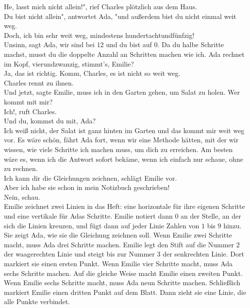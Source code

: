 \frqq{}He, lasst mich nicht allein!", rief Charles plötzlich aus dem Haus.\flqq{}\\
\frqq{}Du bist nicht allein", antwortet Ada, "und außerdem bist du nicht einmal weit weg.\flqq{}\\
\frqq{}Doch, ich bin sehr weit weg, mindestens hundertachtundfünfzig!\flqq{}\\
\frqq{}Unsinn\flqq{}, sagt Ada, \frqq{}wir sind bei $12$ und du bist auf $0$. Da du halbe Schritte machst, musst du die doppelte Anzahl an Schritten machen wie ich. Ada rechnet im Kopf, vierundzwanzig, stimmt's, Emilie?\flqq{}\\
\frqq{}Ja, das ist richtig. Komm, Charles, es ist nicht so weit weg.\flqq{}\\
Charles rennt zu ihnen.\\ 
\frqq{}Und jetzt\flqq{}, sagte Emilie, \frqq{}muss ich in den Garten gehen, um Salat zu holen. Wer kommt mit mir?\flqq{}\\
\frqq{}Ich!\flqq{}, ruft Charles.\\
\frqq{}Und du, kommst du mit, Ada?\flqq{}\\
\frqq{}Ich weiß nicht, der Salat ist ganz hinten im Garten und das kommt mir weit weg vor. Es wäre schön\flqq{}, fährt Ada fort, \frqq{}wenn wir eine Methode hätten, mit der wir wissen, wie viele Schritte ich machen muss, um dich zu erreichen. Am besten wäre es, wenn ich die Antwort sofort bekäme, wenn ich einfach nur schaue, ohne zu rechnen.\flqq{}\\
\frqq{}Ich kann dir die Gleichungen zeichnen\flqq{}, schlägt Emilie vor.\\
\frqq{}Aber ich habe sie schon in mein Notizbuch geschrieben!\flqq{}\\
\frqq{}Nein, schau.\flqq{}\\
Emilie zeichnet zwei Linien in das Heft: eine horizontale für ihre eigenen Schritte und eine vertikale für Adas Schritte. Emilie notiert dann $0$ an der Stelle, an der sich die Linien kreuzen, und fügt dann auf jeder Linie Zahlen von $1$ bis $9$ hinzu. Sie zeigt Ada, wie sie die Gleichung zeichnen soll. Wenn Emilie zwei Schritte macht, muss Ada drei Schritte machen. Emilie legt den Stift auf die Nummer $2$ der waagerechten Linie und steigt bis zur Nummer $3$ der senkrechten Linie. Dort markiert sie einen ersten Punkt. Wenn Emilie vier Schritte macht, muss Ada sechs Schritte machen. Auf die gleiche Weise macht Emilie einen zweiten Punkt. Wenn Emilie sechs Schritte macht, muss Ada neun Schritte machen. Schließlich markiert Emilie einen dritten Punkt auf dem Blatt. Dann zieht sie eine Linie, die alle Punkte verbindet.\\
